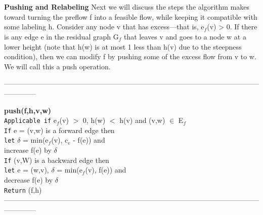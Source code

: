 \documentclass{article}
\begin{document}
\\

\\

\textbf{Pushing and Relabeling} Next we will discuss the steps the algorithm makes toward turning the preflow f into a feasible flow, while keeping it compatible with some labeling h. Consider any node v that has excess—that is, e$_f$(v) > 0. If there is any edge e in the residual graph G$_f$ that leaves v and goes to a node w at a lower height (note that h(w) is at most 1 less than h(v) due to the steepness condition), then we can modify f by pushing some of the excess flow from v to w. We will call this a push operation.

\medskip
--------------------------------------------------------------------------------------------------------------------------
\medskip

\textbf{push(f,h,v,w)}\\
\texttt{Applicable if} e$_f$(v) $>$ 0, h(w) $<$ h(v) and (v,w) $\in$ E$_f$\\
\texttt{If} e = (v,w) is a forward edge then\\
\texttt{let} $\delta$ = min(e$_f$(v), c$_e$ - f(e)) and\\
increase f(e) by $\delta$\\
\texttt{If} (v,W) is a backward edge then\\
\texttt{let} e = (w,v), $\delta$ = min(e$_f$(v), f(e)) and\\
decrease f(e) by $\delta$\\
\texttt{Return} (f,h)\\

\medskip
--------------------------------------------------------------------------------------------------------------------------
\medskip
\end{document}
